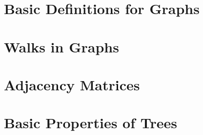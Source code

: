 \section{Basic Definitions for Graphs}
    
\clearpage

\section{Walks in Graphs}
    
\clearpage

\section{Adjacency Matrices}
    
\clearpage

\section{Basic Properties of Trees}
    
